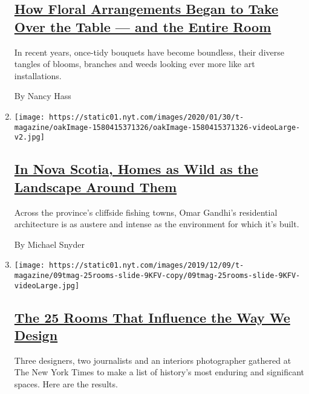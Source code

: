 \begin{enumerate}
  \hypertarget{how-floral-arrangements-began-to-take-over-the-table--and-the-entire-room}{%
  \subsection{\texorpdfstring{\href{/2020/03/04/t-magazine/flower-arrangements-sculptures.html}{How
  Floral Arrangements Began to Take Over the Table --- and the Entire
  Room}}{How Floral Arrangements Began to Take Over the Table --- and the Entire Room}}\label{how-floral-arrangements-began-to-take-over-the-table--and-the-entire-room}}

  In recent years, once-tidy bouquets have become boundless, their
  diverse tangles of blooms, branches and weeds looking ever more like
  art installations.

  By Nancy Hass
\item
  \texttt{[image: https://static01.nyt.com/images/2020/01/30/t-magazine/oakImage-1580415371326/oakImage-1580415371326-videoLarge-v2.jpg]}

  \hypertarget{in-nova-scotia-homes-as-wild-as-the-landscape-around-them}{%
  \subsection{\texorpdfstring{\href{/2020/02/03/t-magazine/nova-scotia-architecture.html}{In
  Nova Scotia, Homes as Wild as the Landscape Around
  Them}}{In Nova Scotia, Homes as Wild as the Landscape Around Them}}\label{in-nova-scotia-homes-as-wild-as-the-landscape-around-them}}

  Across the province's cliffside fishing towns, Omar Gandhi's
  residential architecture is as austere and intense as the environment
  for which it's built.

  By Michael Snyder
\item
  \texttt{[image: https://static01.nyt.com/images/2019/12/09/t-magazine/09tmag-25rooms-slide-9KFV-copy/09tmag-25rooms-slide-9KFV-videoLarge.jpg]}

  \hypertarget{the-25-rooms-that-influence-the-way-we-design}{%
  \subsection{\texorpdfstring{\href{/2019/12/09/t-magazine/25-rooms-influence-design.html}{The
  25 Rooms That Influence the Way We
  Design}}{The 25 Rooms That Influence the Way We Design}}\label{the-25-rooms-that-influence-the-way-we-design}}

  Three designers, two journalists and an interiors photographer
  gathered at The New York Times to make a list of history's most
  enduring and significant spaces. Here are the results.
\end{enumerate}

